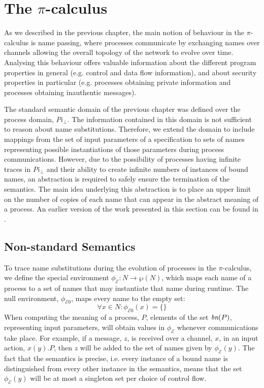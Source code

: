 \documentclass[10pt,a4paper,final,oneside,fleqn]{book}
\begin{document}
\section{The $\pi$-calculus\label{sect:piai}}
As we described in the previous chapter, the main notion of behaviour in the $\pi$-calculus is name passing, where processes communicate by exchanging names over channels allowing the overall topology of the network to evolve over time.  Analysing this behaviour offers valuable information about the different program properties in general (e.g. control and data flow information), and about security properties in particular (e.g. processes obtaining private information and processes obtaining inauthentic messages).

The standard semantic domain of the previous chapter was defined over the process domain, $Pi_\bot$. The information contained in this domain is not sufficient to reason about name substitutions.  Therefore, we extend the domain to include mappings from the set of input parameters of a specification to sets of names representing possible instantiations of those parameters during process communications.  However, due to the possibility of processes having infinite traces in $Pi_\bot$ and their ability to create infinite numbers of instances of bound names, an abstraction is required to safely ensure the termination of the semantics. The main idea underlying this abstraction is to place an upper limit on the number of copies of each name that can appear in the abstract meaning of a process.  An earlier version of the work presented in this section can be found in \cite{aziz2}.
\subsection{Non-standard Semantics\label{sect:nonstandpi}}
To trace name substitutions during the evolution of processes in the $\pi$-calculus, we define the special environment $\phi_\mathcal{E}:N\to\wp(N)$, which maps each name of a process to a set of names that may instantiate that name during runtime.  The null environment, $\phi_{\mathcal{E}0}$, maps every name to the empty set:
\[\forall x\in N:\phi_{\mathcal{E}0}(x)=\{\}\]
When computing the meaning of a process, $P$, elements of the set $\mbox{{\itshape bn}}(P)$, representing input parameters, will obtain values in $\phi_\mathcal{E}$ whenever communications take place.  For example, if a message, $z$, is received over a channel, $x$, in an input action, $x(y).P$, then $z$ will be added to the set of names given by $\phi_\mathcal{E}(y)$. The fact that the semantics is precise, i.e. every instance of a bound name is distinguished from every other instance in the semantics, means that the set $\phi_\mathcal{E}(y)$ will be at most a singleton set per choice of control flow.
\end{document}
